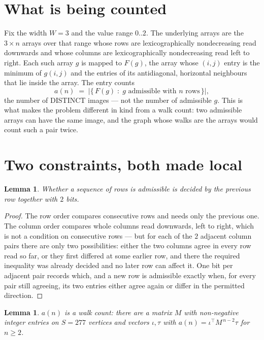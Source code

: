 \documentclass[11pt,a4paper]{article}
\theoremstyle{plain}
\newtheorem{lemma}[theorem]{Lemma}
\theoremstyle{definition}
\begin{document}
\section{What is being counted}

Fix the width $W=3$ and the value range $0..2$. The underlying arrays are the
$3\times n$ arrays over that range whose rows are lexicographically nondecreasing read downwards
and whose columns are lexicographically nondecreasing read left to right. Each such array $g$
is mapped to $F(g)$, the array whose $(i,j)$ entry is the minimum of $g(i,j)$ and the entries
of its antidiagonal, horizontal neighbours that lie inside the array. The entry counts
\[
a(n)\;=\;\bigl|\{\,F(g)\;:\;g\text{ admissible with }n\text{ rows}\,\}\bigr|,
\]
the number of DISTINCT images --- not the number of admissible $g$. This is what makes the
problem different in kind from a walk count: two admissible arrays can have the same image, and
the graph whose walks are the arrays would count such a pair twice.

\section{Two constraints, both made local}

\begin{lemma}\label{lem:local}
Whether a sequence of rows is admissible is decided by the previous row together with
$2$ bits.
\end{lemma}

\begin{proof}
The row order compares consecutive rows and needs only the previous one. The column order
compares whole columns read downwards, left to right, which is not a condition on consecutive
rows --- but for each of the $2$ adjacent column pairs there are only two possibilities:
either the two columns agree in every row read so far, or they first differed at some earlier
row, and there the required inequality was already decided and no later row can affect it. One
bit per adjacent pair records which, and a new row is admissible exactly when, for every pair
still agreeing, its two entries either agree again or differ in the permitted direction.
\end{proof}

\begin{lemma}\label{lem:det}
$a(n)$ is a walk count: there are a matrix $M$ with non-negative integer entries on $S=277$
vertices and vectors $\iota,\tau$ with $a(n)=\iota^{\!\top}M^{\,n-2}\tau$ for $n\ge2$.
\end{lemma}
\end{document}
